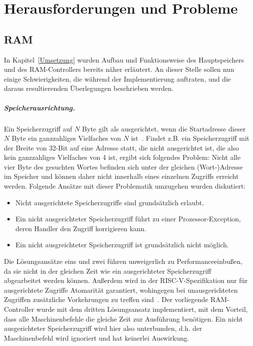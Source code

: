 \chapter{Herausforderungen und Probleme} %
\label{Probleme} %

\section{RAM}

In Kapitel~\ref{Umsetzung} wurden Aufbau und Funktionsweise des Hauptspeichers und des RAM-Controllers bereits näher erläutert.
An dieser Stelle sollen nun einige Schwierigkeiten, die während der Implementierung auftraten, und die daraus resultierenden Überlegungen beschrieben werden.

\paragraph{Speicherausrichtung.} 
Ein Speicherzugriff auf $N$ Byte gilt als ausgerichtet, wenn die Startadresse dieser $N$ Byte ein ganzzahliges Vielfaches von $N$ ist~\cite[S. 96/97]{Hennessy}.
Findet z.B. ein Speicherzugriff mit der Breite von 32-Bit auf eine Adresse statt, die nicht ausgerichtet ist, die also kein ganzzahliges Vielfaches von 4 ist, ergibt sich folgendes Problem:
Nicht alle vier Byte des gesuchten Wortes befinden sich unter der gleichen (Wort-)Adresse im Speicher und können daher nicht innerhalb eines einzelnen Zugriffs erreicht werden.
Folgende Ansätze mit dieser Problematik umzugehen wurden diskutiert:
\begin{itemize}
    \item Nicht ausgerichtete Speicherzugriffe sind grundsätzlich erlaubt.
    \item Ein nicht ausgerichteter Speicherzugriff führt zu einer Prozessor-Exception, deren Handler den Zugriff korrigieren kann.
    \item Ein nicht ausgreichteter Speicherzugriff ist grundsätzlich nicht möglich.
\end{itemize}

Die Lösungsansätze eins und zwei führen unweigerlich zu Performanceeinbußen, da sie nicht in der gleichen Zeit wie ein ausgerichteter Speicherzugriff abgearbeitet werden können.
Außerdem wird in der RISC-V-Spezifikation nur für ausgerichtete Zugriffe Atomarität garantiert, wohingegen bei unausgerichteten Zugriffen zusätzliche Vorkehrungen zu treffen sind~\cite[S. 18]{RISC}.
Der vorliegende RAM-Controller wurde mit dem dritten Lösungsansatz implementiert, mit dem Vorteil, dass alle Maschinenbefehle die gleiche Zeit zur Ausführung benötigen.
Ein nicht ausgerichteter Speicherzugriff wird hier also unterbunden, d.h. der Maschinenbefehl wird ignoriert und hat keinerlei Auswirkung.

